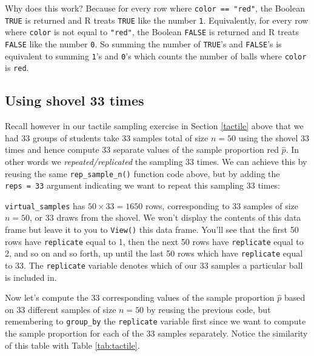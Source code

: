 \documentclass[12pt,]{krantz}
\makeatletter
\newenvironment{Shaded}{\begin{snugshade}}{\end{snugshade}}
\newcommand{\KeywordTok}[1]{\textcolor[rgb]{0.27,0.27,0.27}{\textbf{#1}}}
\newcommand{\DataTypeTok}[1]{\textcolor[rgb]{0.27,0.27,0.27}{#1}}
\newcommand{\DecValTok}[1]{\textcolor[rgb]{0.06,0.06,0.06}{#1}}
\newcommand{\StringTok}[1]{\textcolor[rgb]{0.5,0.5,0.5}{#1}}
\newcommand{\OperatorTok}[1]{\textcolor[rgb]{0.43,0.43,0.43}{\textbf{#1}}}
\newcommand{\NormalTok}[1]{#1}
\newenvironment{kframe}{%
\medskip{}
\setlength{\fboxsep}{.8em}
 \def\at@end@of@kframe{}%
 \ifinner\ifhmode%
  \def\at@end@of@kframe{\end{minipage}}%
  \begin{minipage}{\columnwidth}%
 \fi\fi%
 \def\FrameCommand##1{\hskip\@totalleftmargin \hskip-\fboxsep
 \colorbox{shadecolor}{##1}\hskip-\fboxsep
     \hskip-\linewidth \hskip-\@totalleftmargin \hskip\columnwidth}%
 \MakeFramed {\advance\hsize-\width
   \@totalleftmargin\z@ \linewidth\hsize
   \@setminipage}}%
 {\par\unskip\endMakeFramed%
 \at@end@of@kframe}
\renewenvironment{Shaded}{\begin{kframe}}{\end{kframe}}
\theoremstyle{definition}
\theoremstyle{definition}
\theoremstyle{definition}
\theoremstyle{remark}
\makeatother
\begin{document}
Why does this work? Because for every row where
\texttt{color\ ==\ "red"}, the Boolean \texttt{TRUE} is returned and R
treats \texttt{TRUE} like the number \texttt{1}. Equivalently, for every
row where \texttt{color} is not equal to \texttt{"red"}, the Boolean
\texttt{FALSE} is returned and R treats \texttt{FALSE} like the number
\texttt{0}. So summing the number of \texttt{TRUE}'s and
\texttt{FALSE}'s is equivalent to summing \texttt{1}'s and \texttt{0}'s
which counts the number of balls where \texttt{color} is \texttt{red}.

\subsection{Using shovel 33 times}\label{using-shovel-33-times}

Recall however in our tactile sampling exercise in Section \ref{tactile}
above that we had 33 groups of students take 33 samples total of size
\(n=50\) using the shovel 33 times and hence compute 33 separate values
of the sample proportion red \(\widehat{p}\). In other words we
\emph{repeated/replicated} the sampling 33 times. We can achieve this by
reusing the same \texttt{rep\_sample\_n()} function code above, but by
adding the \texttt{reps\ =\ 33} argument indicating we want to repeat
this sampling 33 times:

\begin{Shaded}
\end{Shaded}

\texttt{virtual\_samples} has \(50 \times 33 = 1650\) rows,
corresponding to 33 samples of size \(n=50\), or 33 draws from the
shovel. We won't display the contents of this data frame but leave it to
you to \texttt{View()} this data frame. You'll see that the first 50
rows have \texttt{replicate} equal to 1, then the next 50 rows have
\texttt{replicate} equal to 2, and so on and so forth, up until the last
50 rows which have \texttt{replicate} equal to 33. The
\texttt{replicate} variable denotes which of our 33 samples a particular
ball is included in.

Now let's compute the 33 corresponding values of the sample proportion
\(\widehat{p}\) based on 33 different samples of size \(n=50\) by
reusing the previous code, but remembering to \texttt{group\_by} the
\texttt{replicate} variable first since we want to compute the sample
proportion for each of the 33 samples separately. Notice the similarity
of this table with Table \ref{tab:tactile}.
\end{document}
